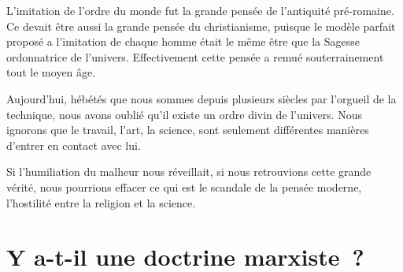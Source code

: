 \documentclass[french,twoside]{book} %
\begin{document}
L'imitation de l'ordre du monde fut la grande pensée de l'antiquité pré-romaine. Ce devait être aussi la grande pensée du christianisme, puisque le modèle parfait proposé a l'imitation de chaque homme était le même être que la Sagesse ordonnatrice de l'univers. Effectivement cette pensée a remué souterrainement tout le moyen âge.\par
Aujourd'hui, hébétés que nous sommes depuis plusieurs siècles par l'orgueil de la technique, nous avons oublié qu'il existe un ordre divin de l'univers. Nous ignorons que le travail, l'art, la science, sont seulement différentes manières d'entrer en contact avec lui.\par
Si l'humiliation du malheur nous réveillait, si nous retrouvions cette grande vérité, nous pourrions effacer ce qui est le scandale de la pensée moderne, l'hostilité entre la religion et la science.\par

\section[{Y a-t-il une doctrine marxiste ?}]{Y a-t-il une doctrine marxiste ?}\renewcommand{\leftmark}{Y a-t-il une doctrine marxiste ?}
\end{document}
